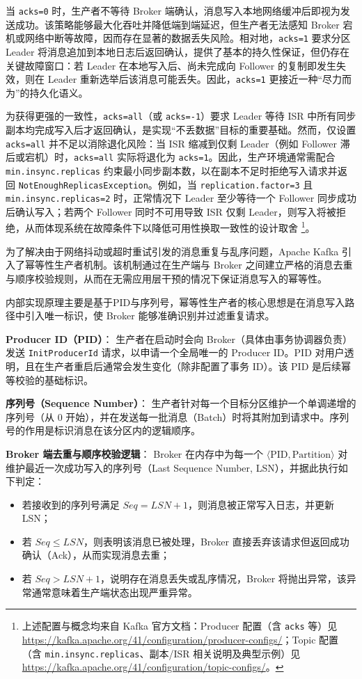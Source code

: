 当 \texttt{acks=0} 时，生产者不等待 Broker 端确认，消息写入本地网络缓冲后即视为发送成功。该策略能够最大化吞吐并降低端到端延迟，但生产者无法感知 Broker 宕机或网络中断等故障，因而存在显著的数据丢失风险。相对地，\texttt{acks=1} 要求分区 Leader 将消息追加到本地日志后返回确认，提供了基本的持久性保证，但仍存在关键故障窗口：若 Leader 在本地写入后、尚未完成向 Follower 的复制即发生失效，则在 Leader 重新选举后该消息可能丢失。因此，\texttt{acks=1} 更接近一种“尽力而为”的持久化语义。

为获得更强的一致性，\texttt{acks=all}（或 \texttt{acks=-1}）要求 Leader 等待 ISR 中所有同步副本均完成写入后才返回确认，是实现“不丢数据”目标的重要基础。然而，仅设置 \texttt{acks=all} 并不足以消除退化风险：当 ISR 缩减到仅剩 Leader（例如 Follower 滞后或宕机）时，\texttt{acks=all} 实际将退化为 \texttt{acks=1}。因此，生产环境通常需配合 \texttt{min.insync.replicas} 约束最小同步副本数，以在副本不足时拒绝写入请求并返回 \texttt{NotEnoughReplicasException}。例如，当 \texttt{replication.factor=3} 且 \texttt{min.insync.replicas=2} 时，正常情况下 Leader 至少等待一个 Follower 同步成功后确认写入；若两个 Follower 同时不可用导致 ISR 仅剩 Leader，则写入将被拒绝，从而体现系统在故障条件下以降低可用性换取一致性的设计取舍%
\footnote{上述配置与概念均来自 Kafka 官方文档：Producer 配置（含 \texttt{acks} 等）见 \url{https://kafka.apache.org/41/configuration/producer-configs/}；Topic 配置（含 \texttt{min.insync.replicas}、副本/ISR 相关说明及典型示例）见 \url{https://kafka.apache.org/41/configuration/topic-configs/}。}。

为了解决由于网络抖动或超时重试引发的消息重复与乱序问题，Apache Kafka 引入了幂等性生产者机制。该机制通过在生产端与 Broker 之间建立严格的消息去重与顺序校验规则，从而在无需应用层干预的情况下保证消息写入的幂等性。



内部实现原理主要是基于PID与序列号，幂等性生产者的核心思想是在消息写入路径中引入唯一标识，使 Broker 能够准确识别并过滤重复请求。

\textbf{Producer ID（PID）}：  
生产者在启动时会向 Broker（具体由事务协调器负责）发送 \texttt{InitProducerId} 请求，以申请一个全局唯一的 Producer ID。PID 对用户透明，且在生产者重启后通常会发生变化（除非配置了事务 ID）。该 PID 是后续幂等校验的基础标识。

\textbf{序列号（Sequence Number）}：  
生产者针对每一个目标分区维护一个单调递增的序列号（从 0 开始），并在发送每一批消息（Batch）时将其附加到请求中。序列号的作用是标识消息在该分区内的逻辑顺序。

\textbf{Broker 端去重与顺序校验逻辑}：  
Broker 在内存中为每一个 \(\langle \text{PID}, \text{Partition} \rangle\) 对维护最近一次成功写入的序列号（Last Sequence Number, LSN），并据此执行如下判定：
\begin{itemize}
    \item 若接收到的序列号满足 \(Seq = LSN + 1\)，则消息被正常写入日志，并更新 LSN；
    \item 若 \(Seq \leq LSN\)，则表明该消息已被处理，Broker 直接丢弃该请求但返回成功确认（Ack），从而实现消息去重；
    \item 若 \(Seq > LSN + 1\)，说明存在消息丢失或乱序情况，Broker 将抛出异常，该异常通常意味着生产端状态出现严重异常。
\end{itemize}

